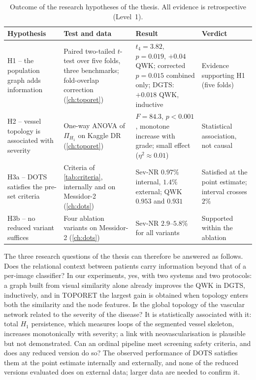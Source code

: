 \begin{table}[!htbp]
\centering
\caption[Outcome of the research hypotheses]{Outcome of the research hypotheses of the
thesis. All evidence is retrospective (Level~1).}
\label{tab:hypsummary}
\small
\begin{tabular}{@{}P{3.4cm}P{3.9cm}P{4.4cm}P{2.6cm}@{}}
\toprule
Hypothesis & Test and data & Result & Verdict \\
\midrule
H1 -- the population graph adds information & Paired two-tailed $t$-test over five folds, three benchmarks; fold-overlap correction (\cref{ch:toporet}) & $t_4=3.82$, $p=0.019$, $+0.04$ QWK; corrected $p=0.015$ combined only; DGTS: $+0.018$ QWK, inductive & Evidence supporting H1 (five folds) \\
H2 -- vessel topology is associated with severity & One-way ANOVA of $\Pi_{H_1}$ on Kaggle DR (\cref{ch:toporet}) & $F=84.3$, $p<0.001$, monotone increase with grade; small effect ($\eta^2\approx0.01$) & Statistical association, not causal \\
H3a -- DOTS satisfies the pre-set criteria & Criteria of \cref{tab:criteria}, internally and on Messidor-2 (\cref{ch:dots}) & Sev-NR $0.97\%$ internal, $1.4\%$ external; QWK $0.953$ and $0.931$ & Satisfied at the point estimate; interval crosses $2\%$ \\
H3b -- no reduced variant suffices & Four ablation variants on Messidor-2 (\cref{ch:dots}) & Sev-NR $2.9$--$5.8\%$ for all variants & Supported within the ablation \\
\bottomrule
\end{tabular}
\end{table}

The three research questions of the thesis can therefore be answered as follows. Does
the relational context between patients carry information beyond that of a per-image
classifier? In our experiments, yes, with two systems and two protocols: a graph built from visual similarity
alone already improves the QWK in DGTS, inductively, and in TOPORET the largest gain is
obtained when topology enters both the similarity and the node features. Is the global topology of the vascular network
related to the severity of the disease? It is statistically associated with it: total
$H_1$ persistence, which measures loops of the segmented vessel skeleton, increases
monotonically with severity; a link with neovascularisation is plausible but not
demonstrated. Can an ordinal pipeline meet screening safety criteria, and
does any reduced version do so? The observed performance of DOTS satisfies them at the point estimate internally and
externally, and none of the reduced versions evaluated does on external data; larger data
are needed to confirm it.

